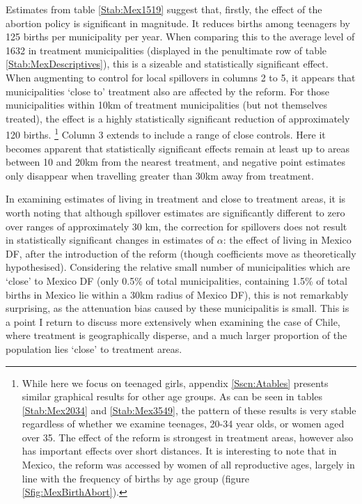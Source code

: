 

Estimates from table \ref{Stab:Mex1519} suggest that, firstly, the effect of
the abortion policy is significant in magnitude.  It reduces births among 
teenagers by 125 births per municipality per year. When comparing this to the
average level of 1632 in treatment municipalities (displayed in the 
penultimate row of table \ref{Stab:MexDescriptives}), this is a sizeable and
statistically significant effect.  When augmenting to control for local
spillovers in columns 2 to 5, it appears that municipalities `close to' 
treatment also are affected by the reform.  For those municipalities within
10km of treatment municipalities (but not themselves treated), the effect is 
a highly statistically significant reduction of approximately 120 births.%
\footnote{While here we focus on teenaged girls, appendix \ref{Sscn:Atables} 
presents similar graphical results for other age groups.  As can be seen in
tables \ref{Stab:Mex2034} and \ref{Stab:Mex3549}, the pattern of these
results is very stable regardless of whether we examine teenages, 20-34
year olds, or women aged over 35.  The effect of the reform is strongest
in treatment areas, however also has important effects over short distances.
It is interesting to note that in Mexico, the reform was accessed by women
of all reproductive ages, largely in line with the frequency of births by
age group (figure \ref{Sfig:MexBirthAbort}).} Column 3 extends to include a 
range of close controls.  Here it becomes apparent that statistically 
significant effects remain at least up to areas between 10 and 20km from the 
nearest treatment, and negative point estimates only disappear when 
travelling greater than 30km away from treatment.  

In examining estimates of living in treatment and close to treatment areas, it 
is worth noting that although spillover estimates are significantly different
to zero over ranges of approximately 30 km, the correction for spillovers
does not result in statistically significant changes in estimates of $\alpha$:
the effect of living in Mexico DF, after the introduction of the reform 
(though coefficients move as theoretically hypothesised).  Considering the
relative small number of municipalities which are `close' to Mexico DF (only
0.5\% of total municipalities, containing 1.5\% of total births in Mexico lie 
within a 30km radius of Mexico DF), this is not remarkably surprising, as the 
attenuation bias caused by these municipalitis is small. This is a point I 
return to discuss more extensively when examining the case of Chile, where 
treatment is geographically disperse, and a much larger proportion of the 
population lies `close' to treatment areas.

